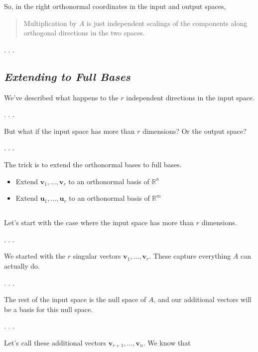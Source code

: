 \documentclass[
  letterpaper,
  DIV=11,
  numbers=noendperiod]{scrartcl}
\providecommand{\tightlist}{%
  \setlength{\itemsep}{0pt}\setlength{\parskip}{0pt}}\usepackage{longtable,booktabs,array}
\begin{document}
So, in the right orthonormal coordinates in the input and output spaces,

\begin{quote}
Multiplication by \(A\) is just independent scalings of the components
along orthogonal directions in the two spaces.
\end{quote}

. . .

\subsection{\texorpdfstring{\emph{Extending to Full
Bases}}{Extending to Full Bases}}\label{extending-to-full-bases}

We've described what happens to the \(r\) independent directions in the
input space.

. . .

But what if the input space has more than \(r\) dimensions? Or the
output space?

. . .

The trick is to extend the orthonormal bases to full bases.

\begin{itemize}
\tightlist
\item
  Extend \(\mathbf{v}_1,\dots,\mathbf{v}_r\) to an orthonormal basis of
  \(\mathbb{R}^n\)
\item
  Extend \(\mathbf{u}_1,\dots,\mathbf{u}_r\) to an orthonormal basis of
  \(\mathbb{R}^m\)
\end{itemize}

\subsection{\texorpdfstring{\emph{}}{}}\label{section-2}

Let's start with the case where the input space has more than \(r\)
dimensions.

. . .

We started with the \(r\) singular vectors
\(\mathbf{v}_1,\dots,\mathbf{v}_r\). These capture everything \(A\) can
actually do.

. . .

The rest of the input space is the null space of \(A\), and our
additional vectors will be a basis for this null space.

. . .

Let's call these additional vectors
\(\mathbf{v}_{r+1},\dots,\mathbf{v}_n\). We know that
\end{document}
